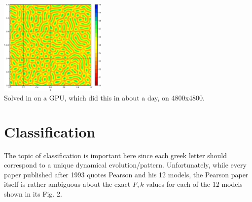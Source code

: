 \begin{center}
\includegraphics[width=5.2cm]{python_codes/fieldstone_171/images/uu000020.jpg}\\
{\captionfont Solved in on a GPU, which did this in about a day, on 4800x4800.}
\end{center}

\section*{Classification}

The topic of classification is important here since each greek letter
should correspond to a unique dynamical evolution/pattern.
Unfortunately, while every paper published after 1993 quotes Pearson and 
his 12 models, the Pearson paper itself is rather ambiguous about 
the exact $F,k$ values for each of the 12 models shown in its Fig. 2.

